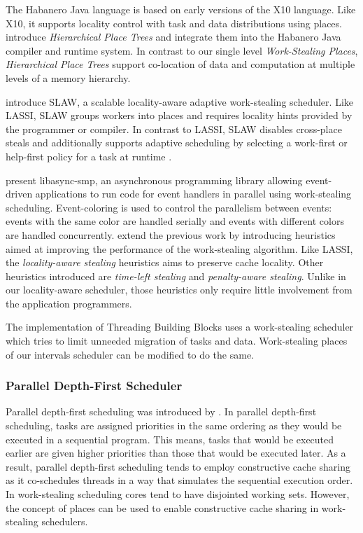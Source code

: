 The Habanero Java \cite{HJ} language is based on early versions of the
X10 language. Like X10, it supports locality control with task and
data distributions using places. \textcite{Yan2009} introduce
\emph{Hierarchical Place Trees} and integrate them into the Habanero
Java compiler and runtime system. In contrast to our single level
\emph{Work-Stealing Places}, \emph{Hierarchical Place Trees} support
co-location of data and computation at multiple levels of a memory
hierarchy.

\textcite{Guo2010} introduce SLAW, a scalable locality-aware adaptive
work-stealing scheduler. Like LASSI, SLAW groups workers into places
and requires locality hints provided by the programmer or compiler. In
contrast to LASSI, SLAW disables cross-place steals and additionally
supports adaptive scheduling by selecting a work-first or help-first
policy for a task at runtime \cite{Guo2009}.

\textcite{Zeldovich2003} present libasync-smp, an asynchronous
programming library allowing event-driven applications to run code for
event handlers in parallel using work-stealing
scheduling. Event-coloring is used to control the parallelism between
events: events with the same color are handled serially and events
with different colors are handled concurrently. \textcite{Gaud2010}
extend the previous work by introducing heuristics aimed at improving
the performance of the work-stealing algorithm. Like LASSI, the
\emph{locality-aware stealing} heuristics aims to preserve cache
locality. Other heuristics introduced are \emph{time-left stealing}
and \emph{penalty-aware stealing}. Unlike in our locality-aware
scheduler, those heuristics only require little involvement from the
application programmers.

The implementation of Threading Building Blocks \cite{Contreras2008,
  Reinders2007} uses a work-stealing scheduler which tries to limit
unneeded migration of tasks and data. Work-stealing places of our
intervals scheduler can be modified to do the same.

\subsubsection{Parallel Depth-First Scheduler}

Parallel depth-first scheduling was introduced by
\textcite{Blelloch1999}. In parallel depth-first scheduling, tasks are
assigned priorities in the same ordering as they would be executed in
a sequential program. This means, tasks that would be executed earlier
are given higher priorities than those that would be executed
later. As a result, parallel depth-first scheduling tends to employ
constructive cache sharing \cite{Liaskovitis2006, Chen2007} as it
co-schedules threads in a way that simulates the sequential execution
order. In work-stealing scheduling cores tend to have disjointed
working sets. However, the concept of places can be used to enable
constructive cache sharing in work-stealing schedulers.


